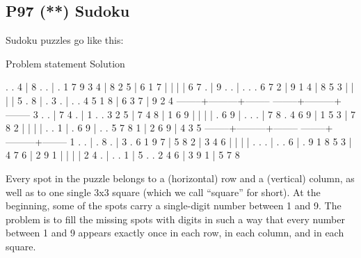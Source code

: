 \pagebreak{}
\subsection*{{P97} (**) Sudoku}
\label{sec:99-problems-P97}

Sudoku puzzles go like this:

\begin{wideverbatim}
Problem statement                 Solution

 .  .  4 | 8  .  . | .  1  7      9  3  4 | 8  2  5 | 6  1  7
         |         |                      |         |
 6  7  . | 9  .  . | .  .  .      6  7  2 | 9  1  4 | 8  5  3
         |         |                      |         |
 5  .  8 | .  3  . | .  .  4      5  1  8 | 6  3  7 | 9  2  4
 --------+---------+--------      --------+---------+--------
 3  .  . | 7  4  . | 1  .  .      3  2  5 | 7  4  8 | 1  6  9
         |         |                      |         |
 .  6  9 | .  .  . | 7  8  .      4  6  9 | 1  5  3 | 7  8  2
         |         |                      |         |
 .  .  1 | .  6  9 | .  .  5      7  8  1 | 2  6  9 | 4  3  5
 --------+---------+--------      --------+---------+--------
 1  .  . | .  8  . | 3  .  6      1  9  7 | 5  8  2 | 3  4  6
         |         |                      |         |
 .  .  . | .  .  6 | .  9  1      8  5  3 | 4  7  6 | 2  9  1
         |         |                      |         |
 2  4  . | .  .  1 | 5  .  .      2  4  6 | 3  9  1 | 5  7  8
\end{wideverbatim}

Every spot in the puzzle belongs to a (horizontal) row and a (vertical)
column, as well as to one single 3x3 square (which we call ``square''
for short). At the beginning, some of the spots carry a single-digit
number between 1 and 9. The problem is to fill the missing spots with
digits in such a way that every number between 1 and 9 appears exactly
once in each row, in each column, and in each square.

